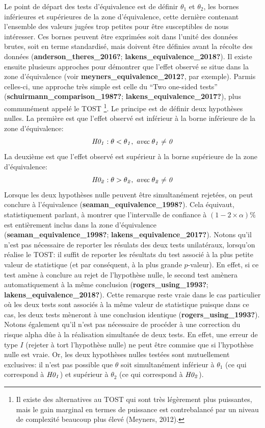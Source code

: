 \documentclass[
  english,
  man]{apa6}
\begin{document}
Le point de départ des tests d'équivalence est de définir \(\theta_1\) et \(\theta_2\), les bornes inférieures et supérieures de la zone d'équivalence, cette dernière contenant l'ensemble des valeurs jugées trop petites pour être susceptibles de nous intéresser. Ces bornes peuvent être exprimées soit dans l'unité des données brutes, soit en terme standardisé, mais doivent être définies avant la récolte des données (\textbf{anderson\_theres\_2016?}; \textbf{lakens\_equivalence\_2018?}). Il existe ensuite plusieurs approches pour démontrer que l'effet observé se situe dans la zone d'équivalence (voir \textbf{meyners\_equivalence\_2012?}, par exemple). Parmis celles-ci, une approche très simple est celle du ``Two one-sided tests'' (\textbf{schuirmann\_comparison\_1987?}; \textbf{lakens\_equivalence\_2017?}), plus communément appelé le TOST \footnote{Il existe des alternatives au TOST qui sont très légèrement plus puissantes, mais le gain marginal en termes de puissance est contrebalancé par un niveau de complexité beaucoup plus élevé (Meyners, 2012).}. Le principe est de définir deux hypothèses nulles. La première est que l'effet observé est inférieur à la borne inférieure de la zone d'équivalence: \[\it H0_1: \theta < \theta_1, \; avec \; \theta_1 \neq 0\] La deuxième est que l'effet observé est supérieur à la borne supérieure de la zone d'équivalence: \[\it H0_2: \theta > \theta_2, \; avec \; \theta_2 \neq 0\] Lorsque les deux hypothèses nulle peuvent être simultanément rejetées, on peut conclure à l'équivalence (\textbf{seaman\_equivalence\_1998?}). Cela équivaut, statistiquement parlant, à montrer que l'intervalle de confiance à \((1-2\times\alpha)\%\) est entièrement inclus dans la zone d'équivalence (\textbf{seaman\_equivalence\_1998?}; \textbf{lakens\_equivalence\_2017?}). Notons qu'il n'est pas nécessaire de reporter les résulats des deux tests unilatéraux, lorsqu'on réalise le TOST: il suffit de reporter les résultats du test associé à la plus petite valeur de statistique (et par conséquent, à la plus grande \(p\)-valeur). En effet, si ce test amène à conclure au rejet de l'hypothèse nulle, le second test amènera automatiquement à la même conclusion (\textbf{rogers\_using\_1993?}; \textbf{lakens\_equivalence\_2018?}). Cette remarque reste vraie dans le cas particulier où les deux tests sont associés à la même valeur de statistique puisque dans ce cas, les deux tests mèneront à une conclusion identique (\textbf{rogers\_using\_1993?}). Notons également qu'il n'est pas nécessaire de procéder à une correction du risque alpha dûe à la réalisation simultanée de deux tests. En effet, une erreur de type \(I\) (rejeter à tort l'hypothèse nulle) ne peut être commise que si l'hypothèse nulle est vraie. Or, les deux hypothèses nulles testées sont mutuellement exclusives: il n'est pas possible que \(\theta\) soit simultanément inférieur à \(\theta_1\) (ce qui correspond à \(\it H0_1\)) et supérieur à \(\theta_2\) (ce qui correspond à \(\it H0_2\)).
\end{document}
